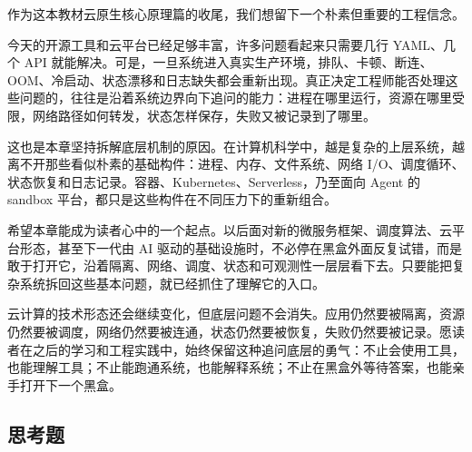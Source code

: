 作为这本教材云原生核心原理篇的收尾，我们想留下一个朴素但重要的工程信念。

今天的开源工具和云平台已经足够丰富，许多问题看起来只需要几行 YAML、几个 API 就能解决。可是，一旦系统进入真实生产环境，排队、卡顿、断连、OOM、冷启动、状态漂移和日志缺失都会重新出现。真正决定工程师能否处理这些问题的，往往是沿着系统边界向下追问的能力：进程在哪里运行，资源在哪里受限，网络路径如何转发，状态怎样保存，失败又被记录到了哪里。

这也是本章坚持拆解底层机制的原因。在计算机科学中，越是复杂的上层系统，越离不开那些看似朴素的基础构件：进程、内存、文件系统、网络 I/O、调度循环、状态恢复和日志记录。容器、Kubernetes、Serverless，乃至面向 Agent 的 sandbox 平台，都只是这些构件在不同压力下的重新组合。

希望本章能成为读者心中的一个起点。以后面对新的微服务框架、调度算法、云平台形态，甚至下一代由 AI 驱动的基础设施时，不必停在黑盒外面反复试错，而是敢于打开它，沿着隔离、网络、调度、状态和可观测性一层层看下去。只要能把复杂系统拆回这些基本问题，就已经抓住了理解它的入口。

云计算的技术形态还会继续变化，但底层问题不会消失。应用仍然要被隔离，资源仍然要被调度，网络仍然要被连通，状态仍然要被恢复，失败仍然要被记录。愿读者在之后的学习和工程实践中，始终保留这种追问底层的勇气：不止会使用工具，也能理解工具；不止能跑通系统，也能解释系统；不止在黑盒外等待答案，也能亲手打开下一个黑盒。

\subsection{思考题}

